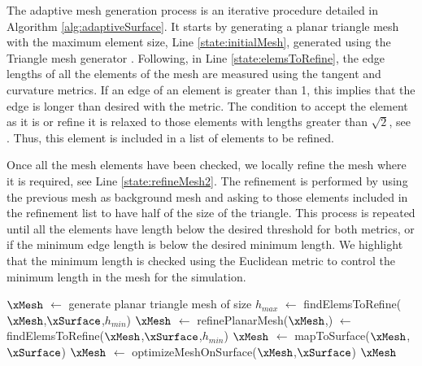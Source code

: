 \documentclass[1p]{elsarticle}
\begin{document}
The adaptive mesh generation process is an iterative procedure  detailed in Algorithm \ref{alg:adaptiveSurface}. 
It starts by generating
a planar triangle mesh with the maximum element size, Line \ref{state:initialMesh},  generated using the Triangle mesh generator \cite{shewchuk1996triangle}. 
Following, in Line \ref{state:elemsToRefine}, the edge lengths of all the elements of the mesh are measured using the tangent and curvature metrics. If an edge of an element is greater than 1, this implies that the edge is longer than desired with the metric. 
The condition to accept the element as it is or refine it is relaxed to those elements with lengths greater than $\sqrt{2}$, see \cite{frey2000surface,Frey2008Book}. 
Thus, this element is included in a list of elements to be refined. 

Once all the mesh elements have been checked, we locally refine the mesh where it is required, see Line \ref{state:refineMesh2}. 
The refinement is performed by using the previous mesh as background mesh and asking to those elements included in the refinement list to have half of the size of the triangle.
This process is repeated until all the elements have length below the desired threshold for both metrics, or if the minimum edge length is below the desired minimum length. We highlight that the minimum length is checked using the Euclidean metric to control the minimum length in the mesh for the simulation.


\begin{algorithm}[t!]
	\caption{Surface mesh generation process adapted to the topography}
	\label{alg:adaptiveSurface}
	\begin{algorithmic}[1]
		\renewcommand{\algorithmicrequire}{\textbf{Input:}}
		\renewcommand{\algorithmicensure}{\textbf{Output:}}
		\State $\xMesh$ $\gets$ generate planar triangle mesh of size $h_{max}$
		\label{state:initialMesh}
		\State \listElemsToRefine $\gets$  findElemsToRefine($\xMesh$,$\xSurface$,$h_{min}$) %
		\label{state:elemsToRefine}
		\While {\listElemsToRefine $\neq\emptyset$}
		\label{state:while}
		\State $\xMesh$ $\gets$ refinePlanarMesh($\xMesh$,\listElemsToRefine)
		\label{state:refineMesh2}
		\State \listElemsToRefine$\gets$findElemsToRefine($\xMesh$,$\xSurface$,$h_{min}$) 
		\label{state:listElemsToRefine2}
		\EndWhile
		\State  $\xMesh$ $\gets$ mapToSurface($\xMesh$,$\xSurface$)
		\label{state:mapToTopo}
		\State  $\xMesh$ $\gets$ optimizeMeshOnSurface($\xMesh$,$\xSurface$)
		\label{state:optimizeOnTopo}
		\State \Return  $\xMesh$
		\EndFunction
	\end{algorithmic}
\end{algorithm}
\end{document}
